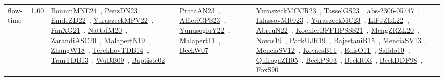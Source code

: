 {\begin{longtable}{p{3cm}r>{\raggedright\arraybackslash}p{6cm}>{\raggedright\arraybackslash}p{6cm}>{\raggedright\arraybackslash}p{8cm}}
\index{flow-time}\index{Concepts!flow-time}flow-time &  1.00 & \href{../works/BonninMNE24.pdf}{BonninMNE24}~\cite{BonninMNE24}, \href{../works/PenzDN23.pdf}{PenzDN23}~\cite{PenzDN23}, \href{../works/EmdeZD22.pdf}{EmdeZD22}~\cite{EmdeZD22}, \href{../works/YuraszeckMPV22.pdf}{YuraszeckMPV22}~\cite{YuraszeckMPV22}, \href{../works/FanXG21.pdf}{FanXG21}~\cite{FanXG21}, \href{../works/NattafM20.pdf}{NattafM20}~\cite{NattafM20}, \href{../works/ZarandiASC20.pdf}{ZarandiASC20}~\cite{ZarandiASC20}, \href{../works/MalapertN19.pdf}{MalapertN19}~\cite{MalapertN19}, \href{../works/ZhangW18.pdf}{ZhangW18}~\cite{ZhangW18}, \href{../works/TerekhovTDB14.pdf}{TerekhovTDB14}~\cite{TerekhovTDB14}, \href{../works/TranTDB13.pdf}{TranTDB13}~\cite{TranTDB13}, \href{../works/WuBB09.pdf}{WuBB09}~\cite{WuBB09}, \href{../works/Baptiste02.pdf}{Baptiste02}~\cite{Baptiste02} & \href{../works/PrataAN23.pdf}{PrataAN23}~\cite{PrataAN23}, \href{../works/AlfieriGPS23.pdf}{AlfieriGPS23}~\cite{AlfieriGPS23}, \href{../works/YunusogluY22.pdf}{YunusogluY22}~\cite{YunusogluY22}, \href{../works/Malapert11.pdf}{Malapert11}~\cite{Malapert11}, \href{../works/BeckW07.pdf}{BeckW07}~\cite{BeckW07} & \href{../works/YuraszeckMCCR23.pdf}{YuraszeckMCCR23}~\cite{YuraszeckMCCR23}, \href{../works/TasselGS23.pdf}{TasselGS23}~\cite{TasselGS23}, \href{../works/abs-2306-05747.pdf}{abs-2306-05747}~\cite{abs-2306-05747}, \href{../works/IklassovMR023.pdf}{IklassovMR023}~\cite{IklassovMR023}, \href{../works/YuraszeckMC23.pdf}{YuraszeckMC23}~\cite{YuraszeckMC23}, \href{../works/LiFJZLL22.pdf}{LiFJZLL22}~\cite{LiFJZLL22}, \href{../works/AbreuN22.pdf}{AbreuN22}~\cite{AbreuN22}, \href{../works/KoehlerBFFHPSSS21.pdf}{KoehlerBFFHPSSS21}~\cite{KoehlerBFFHPSSS21}, \href{../works/MengZRZL20.pdf}{MengZRZL20}~\cite{MengZRZL20}, \href{../works/Novas19.pdf}{Novas19}~\cite{Novas19}, \href{../works/ParkUJR19.pdf}{ParkUJR19}~\cite{ParkUJR19}, \href{../works/BajestaniB15.pdf}{BajestaniB15}~\cite{BajestaniB15}, \href{../works/MenciaSV13.pdf}{MenciaSV13}~\cite{MenciaSV13}, \href{../works/MenciaSV12.pdf}{MenciaSV12}~\cite{MenciaSV12}, \href{../works/KovacsB11.pdf}{KovacsB11}~\cite{KovacsB11}, \href{../works/EdisO11.pdf}{EdisO11}~\cite{EdisO11}, \href{../works/Salido10.pdf}{Salido10}~\cite{Salido10}, \href{../works/QuirogaZH05.pdf}{QuirogaZH05}~\cite{QuirogaZH05}, \href{../works/BeckPS03.pdf}{BeckPS03}~\cite{BeckPS03}, \href{../works/BeckR03.pdf}{BeckR03}~\cite{BeckR03}, \href{../works/BeckDDF98.pdf}{BeckDDF98}~\cite{BeckDDF98}, \href{../works/FoxS90.pdf}{FoxS90}~\cite{FoxS90}\\

\end{longtable}}
